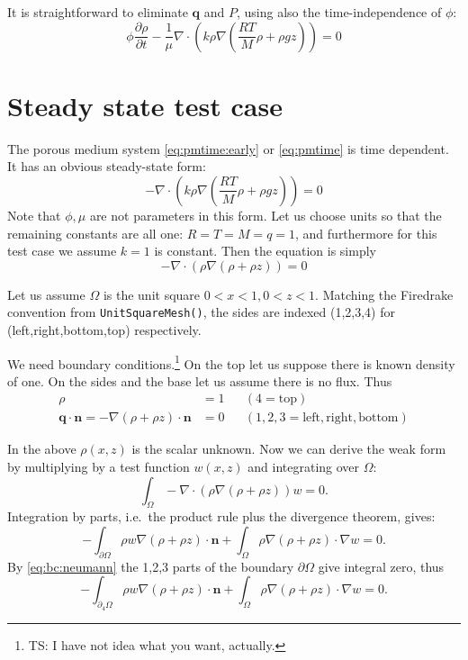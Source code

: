 \documentclass[11pt]{article}
\newcommand{\bn}{\mathbf{n}}
\newcommand{\bq}{\mathbf{q}}
\newcommand{\Div}{\nabla\cdot}
\newcommand{\grad}{\nabla}
\begin{document}
It is straightforward to eliminate $\bq$ and $P$, using also the time-independence of $\phi$:
\begin{equation}
\phi \frac{\partial \rho}{\partial t} - \frac{1}{\mu} \Div \left(k \rho \grad\left(\frac{RT}{M} \rho + \rho g z\right)\right) = 0 \label{eq:pmtime}
\end{equation}


\section{Steady state test case}

The porous medium system \eqref{eq:pmtime:early} or \eqref{eq:pmtime} is time dependent.  It has an obvious steady-state form:
\begin{equation}
- \Div \left(k \rho \grad\left(\frac{RT}{M} \rho + \rho g z\right)\right) = 0 \label{eq:pm:withunits}
\end{equation}
Note that $\phi,\mu$ are not parameters in this form.  Let us choose units so that the remaining constants are all one: $R=T=M=q=1$, and furthermore for this test case we assume $k=1$ is constant.  Then the equation is simply
\begin{equation}
- \Div \left(\rho \grad\left(\rho + \rho z\right)\right) = 0 \label{eq:pm:strong}
\end{equation}

Let us assume $\Omega$ is the unit square $0<x<1,0<z<1$.  Matching the Firedrake convention from \texttt{UnitSquareMesh()}, the sides are indexed (1,2,3,4) for (left,right,bottom,top) respectively.

We need boundary conditions.\footnote{TS: I have not idea what you want, actually.}  On the top let us suppose there is known density of one.  On the sides and the base let us assume there is no flux.  Thus
\begin{subequations}
\begin{align}
\rho &= 1 & &(4=\text{top}) \label{eq:bc:dirichlet} \\
\bq \cdot \bn = - \grad(\rho + \rho z) \cdot \bn &= 0 & &(1,2,3=\text{left},\text{right},\text{bottom}) \label{eq:bc:neumann}
\end{align}
\end{subequations}

In the above $\rho(x,z)$ is the scalar unknown.  Now we can derive the weak form by multiplying by a test function $w(x,z)$ and integrating over $\Omega$:
    $$\int_\Omega- \Div \left(\rho \grad\left(\rho + \rho z\right)\right) w = 0.$$
Integration by parts, i.e.~the product rule plus the divergence theorem, gives:
	$$- \int_{\partial\Omega} \rho w \grad\left(\rho + \rho z\right) \cdot \bn + \int_\Omega \rho \grad\left(\rho + \rho z\right) \cdot \grad w = 0.$$
By \eqref{eq:bc:neumann} the 1,2,3 parts of the boundary $\partial\Omega$ give integral zero, thus
	$$- \int_{\partial_4\Omega} \rho w \grad\left(\rho + \rho z\right) \cdot \bn + \int_\Omega \rho \grad\left(\rho + \rho z\right) \cdot \grad w = 0.$$
\end{document}
